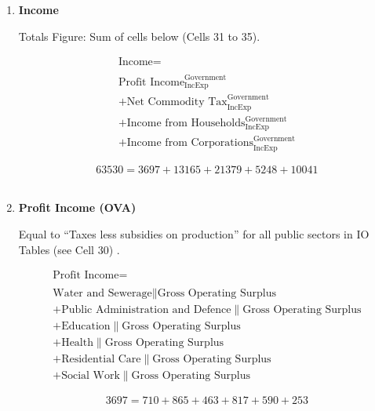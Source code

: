\begin{enumerate}
\item \textbf {Income}

Totals Figure: Sum of cells below (Cells 31 to 35).

\begin{equation}
\begin{split}
\text{Income} =  \\ \\
\text{Profit Income}^\text{Government}_\text{IncExp}\\
+\text{Net Commodity Tax}^\text{Government}_\text{IncExp}\\
+\text{Income from Households}^\text{Government}_\text{IncExp}\\
+\text{Income from Corporations}^\text{Government}_\text{IncExp}
\end{split} \label{eq:2.5.34}
\end{equation}

\begin{equation} \nonumber
63530 = 3697+13165+21379+5248+10041
\end{equation}\\


\item \textbf {Profit Income (OVA)}

Equal to ``Taxes less subsidies on production'' for all public sectors in IO Tables (see Cell 30) \cite{ScotGov2013a}.

\begin{equation}
\begin{split}
\text{Profit Income} =  \\ \\
\text{Water and Sewerage}\|\text{Gross Operating Surplus}\\
+\text{Public Administration and Defence}\|\text{Gross Operating Surplus}\\
+\text{Education}\|\text{Gross Operating Surplus}\\
+\text{Health}\|\text{Gross Operating Surplus}\\
+\text{Residential Care}\|\text{Gross Operating Surplus}\\
+\text{Social Work}\|\text{Gross Operating Surplus}
\end{split} \label{eq:2.5.35}
\end{equation}

\begin{equation} \nonumber
3697 = 710+865+463+817+590+253
\end{equation}\\



\end{enumerate}
